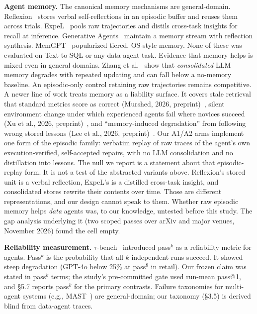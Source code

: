 \documentclass[sigconf, nonacm]{acmart}
\begin{document}
\textbf{Agent memory.} The canonical memory mechanisms are general-domain. Reflexion~\cite{reflexion} stores verbal self-reflections in an episodic buffer and reuses them across trials. ExpeL~\cite{expel} pools raw trajectories and distils cross-task insights for recall at inference. Generative Agents~\cite{generativeagents} maintain a memory stream with reflection synthesis. MemGPT~\cite{memgpt} popularized tiered, OS-style memory. None of these was evaluated on Text-to-SQL or any data-agent task. Evidence that memory helps is mixed even in general domains. Zhang et al.~\cite{zhangmemory} show that \emph{consolidated} LLM memory degrades with repeated updating and can fall below a no-memory baseline. An episodic-only control retaining raw trajectories remains competitive. A newer line of work treats memory as a liability surface. It covers stale retrieval that standard metrics score as correct (Murshed, 2026, preprint)~\cite{stalebench}, silent environment change under which experienced agents fail where novices succeed (Xu et al., 2026, preprint)~\cite{experiencerot}, and ``memory-induced degradation'' from following wrong stored lessons (Lee et al., 2026, preprint)~\cite{wikitrace}. Our A1/A2 arms implement one form of the episodic family: verbatim replay of raw traces of the agent's own execution-verified, self-accepted repairs, with no LLM consolidation and no distillation into lessons. The null we report is a statement about that episodic-replay form. It is not a test of the abstracted variants above. Reflexion's stored unit is a verbal reflection, ExpeL's is a distilled cross-task insight, and consolidated stores rewrite their contents over time. Those are different representations, and our design cannot speak to them. Whether raw episodic memory helps \emph{data} agents was, to our knowledge, untested before this study. The gap analysis underlying it (two scoped passes over arXiv and major venues, November 2026) found the cell empty.

\textbf{Reliability measurement.} $\tau$-bench~\cite{taubench} introduced pass$^k$ as a reliability metric for agents. Pass$^k$ is the probability that all $k$ independent runs succeed. It showed steep degradation (GPT-4o below 25\% at pass$^8$ in retail). Our frozen claim was stated in pass$^k$ terms; the study's pre-committed gate used run-mean pass@1, and \S5.7 reports pass$^k$ for the primary contrasts. Failure taxonomies for multi-agent systems (e.g., MAST~\cite{mast}) are general-domain; our taxonomy (\S3.5) is derived blind from data-agent traces.
\end{document}
